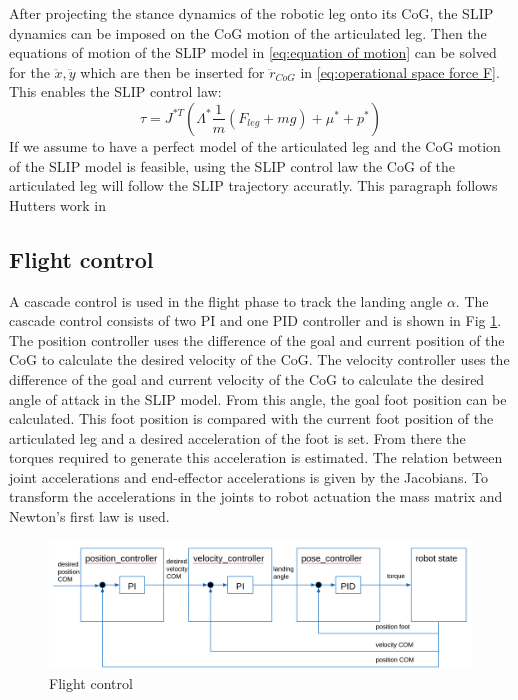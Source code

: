 \documentclass[10pt,conference]{IEEEtran}
\begin{document}
After projecting the stance dynamics of the robotic leg onto its CoG, the SLIP dynamics can be imposed on the CoG motion of the articulated leg. 
Then the equations of motion of the SLIP model 
in \ref{eq:equation of motion} can be solved for the \(\ddot{x}, \ddot{y}\) which are then be inserted for \({\ddot{r}}_{CoG}\) in \ref{eq:operational space force F}. This 
enables the SLIP control law:
\begin{equation}
   \tau = {J}^{*T} ({\Lambda}^{*} \frac{1}{m} ({F}_{leg} + mg) + {\mu}^{*} + {p}^{*})
\end{equation}
If we assume to have a perfect model of the articulated leg and the CoG motion of the SLIP model is feasible, using the SLIP control law the CoG of the articulated leg will 
follow the SLIP trajectory accuratly. This paragraph follows Hutters work in \cite{Hutter2010}


\subsection{Flight control}
A cascade control is used in the flight phase to track the landing angle \(\alpha\). The cascade control consists of two PI and one PID controller and is shown in Fig \ref{fig:cascade}. 
The position controller uses the difference of the goal and current position of the CoG to calculate the desired velocity of the CoG. The velocity controller uses 
the difference of the goal and current velocity of the CoG to calculate the desired angle of attack in the SLIP model. From this angle, the goal foot position can be 
calculated. This foot position is compared with the current foot position of the articulated leg and a desired acceleration of the foot is set. From there the torques 
required to generate this acceleration is estimated. The relation between joint accelerations and end-effector accelerations is given by the 
Jacobians. To transform the accelerations in the joints to robot actuation the mass matrix and Newton's first law is used.

\begin{figure}[h]
   \centering
   \includegraphics[scale=0.11]{"assets/cascade.png"}
   \caption{Flight control}
   \label{fig:cascade}
\end{figure}
\end{document}
